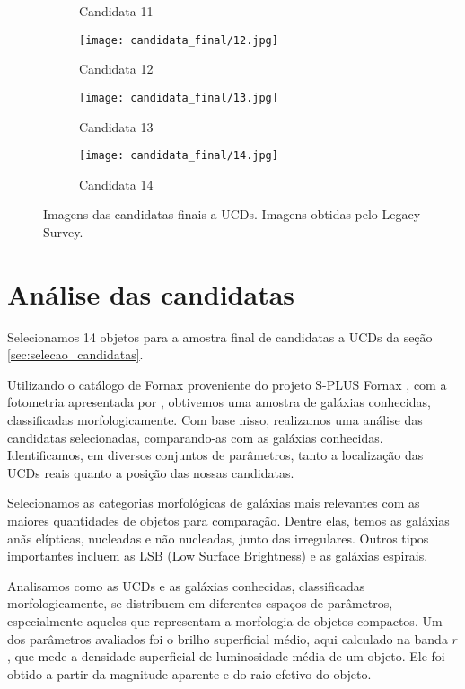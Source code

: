 \begin{figure}[!ht]
\begin{subfigure}[b]{0.25\textwidth}
        \caption{Candidata 11}
    \end{subfigure}
    \begin{subfigure}[b]{0.25\textwidth}
        \texttt{[image: candidata\_final/12.jpg]}
        \caption{Candidata 12}
    \end{subfigure}
    \begin{subfigure}[b]{0.25\textwidth}
        \texttt{[image: candidata\_final/13.jpg]}
        \caption{Candidata 13}
    \end{subfigure}
    \begin{subfigure}[b]{0.25\textwidth}
        \texttt{[image: candidata\_final/14.jpg]}
        \caption{Candidata 14}
    \end{subfigure}
    \caption[]{Imagens das candidatas finais a UCDs. Imagens obtidas pelo Legacy Survey.}
    \label{ucds_candidates_final_imagens}
\end{figure}



\section{Análise das candidatas}\label{sec:analise_candidatas}
Selecionamos 14 objetos para a amostra final de candidatas a UCDs da seção \ref{sec:selecao_candidatas}.

Utilizando o catálogo de Fornax proveniente do projeto S-PLUS Fornax \citep{castelli2024splusfornaxprojectsfp}, com a fotometria apresentada por \citep{haack2024splusfornaxprojectsfp}, obtivemos uma amostra de galáxias conhecidas, classificadas morfologicamente. Com base nisso, realizamos uma análise das candidatas selecionadas, comparando-as com as galáxias conhecidas. Identificamos, em diversos conjuntos de parâmetros, tanto a localização das UCDs reais quanto a posição das nossas candidatas.

Selecionamos as categorias morfológicas de galáxias mais relevantes com as maiores quantidades de objetos para comparação. Dentre elas, temos as galáxias anãs elípticas, nucleadas e não nucleadas, junto das irregulares. Outros tipos importantes incluem as LSB (Low Surface Brightness) e as galáxias espirais.

Analisamos como as UCDs e as galáxias conhecidas, classificadas morfologicamente, se distribuem em diferentes espaços de parâmetros, especialmente aqueles que representam a morfologia de objetos compactos. Um dos parâmetros avaliados foi o brilho superficial médio, aqui calculado na banda $r$, que mede a densidade superficial de luminosidade média de um objeto. Ele foi obtido a partir da magnitude aparente e do raio efetivo do objeto.

